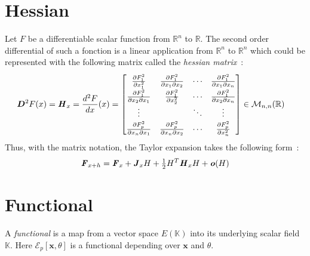 \section{Hessian}
Let $F$ be a differentiable scalar function from $\mathbb{R}^n$ to $\mathbb{R}$. The second order differential of such a fonction is a linear application from $\mathbb{R}^n$ to $\mathbb{R}^n$ which could be represented with the following matrix called the \emph{hessian matrix}~:
\begin{equation}
\renewcommand\arraystretch{1.5}
\begin{aligned}
	&\boldsymbol{D}^{2}F(x) = \mat{H}_{x} = \frac{d^2F}{dx}(x) =
	\begin{bmatrix}
		\frac{\partial F^2_1}{\partial x_1^2} & \frac{\partial F^2_1}{\partial x_1\partial x_2} &\cdots & \frac{\partial F^2_1}{\partial x_1\partial x_n} \\
		\frac{\partial F^2_1}{\partial x_2\partial x_1} & \frac{\partial F^2_1}{\partial x_2^2} &\cdots & \frac{\partial F^2_1}{\partial x_2\partial x_n} \\
		\vdots & &\ddots & \vdots \\
		\frac{\partial F^2_p}{\partial x_n\partial x_1} & \frac{\partial F^2_p}{\partial x_n\partial x_2}&\cdots & \frac{\partial F^2_p}{\partial x_n^2}
	\end{bmatrix}
	\in\mathcal{M}_{n,n}(\mathbb{R})
\end{aligned}
\end{equation}
Thus, with the matrix notation, the Taylor expansion takes the following form~:
\begin{align}
	\boldsymbol{\mathit{F}}_{x+h} = \boldsymbol{\mathit{F}}_{x} +  \boldsymbol{\mathit{J}}_{x} H + \tfrac{1}{2}H^T \boldsymbol{\mathit{H}}_{x} H + \boldsymbol{\mathit{o}}(H)
\end{align}


\section{Functional}
A \emph{functional} is a map from a vector space $E(\mathbb{K})$ into its underlying scalar field $\mathbb{K}$. Here $\mathcal{E}_p[\boldsymbol{x},\theta]$ is a functional depending over $\boldsymbol{x}$ and $\theta$.
